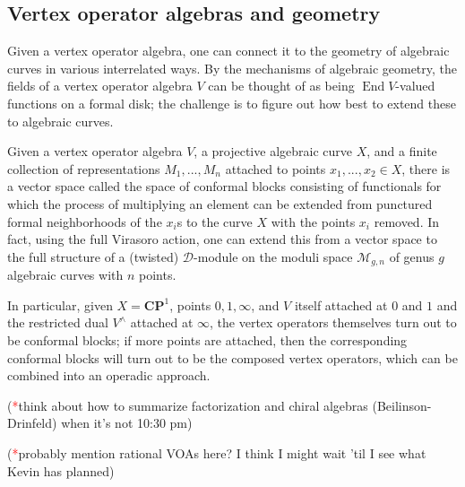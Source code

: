 \documentclass{article}
\newcommand{\CP}{\mathbold{CP}}
\newcommand{\Dd}{\mathcal{D}}
\newcommand{\tk}{\textcolor{red}{*}}
\DeclareMathOperator{\End}{End}
\begin{document}
\subsection{Vertex operator algebras and geometry}
Given a vertex operator algebra, one can connect it to the geometry of algebraic curves in various interrelated ways.  By the mechanisms of algebraic geometry, the fields of a vertex operator algebra $V$ can be thought of as being $\End V$-valued functions on a formal disk; the challenge is to figure out how best to extend these to algebraic curves.

Given a vertex operator algebra $V$, a projective algebraic curve $X$, and a finite collection of representations $M_1,...,M_n$ attached to points $x_1,...,x_2 \in X$, there is a vector space called the space of conformal blocks consisting of functionals for which the process of multiplying an element can be extended from punctured formal neighborhoods of the $x_i$s to the curve $X$ with the points $x_i$ removed.  In fact, using the full Virasoro action, one can extend this from a vector space to the full structure of a (twisted) $\Dd$-module on the moduli space $\mathcal{M}_{g,n}$ of genus $g$ algebraic curves with $n$ points.

In particular, given $X=\CP^1$, points $0,1,\infty$, and $V$ itself attached at $0$ and $1$ and the restricted dual $V^\wedge$ attached at $\infty$, the vertex operators themselves turn out to be conformal blocks; if more points are attached, then the corresponding conformal blocks will turn out to be the composed vertex operators, which can be combined into an operadic approach.

(\tk think about how to summarize factorization and chiral algebras (Beilinson-Drinfeld) when it's not 10:30 pm)

(\tk probably mention rational VOAs here?  I think I might wait 'til I see what Kevin has planned)
\end{document}
